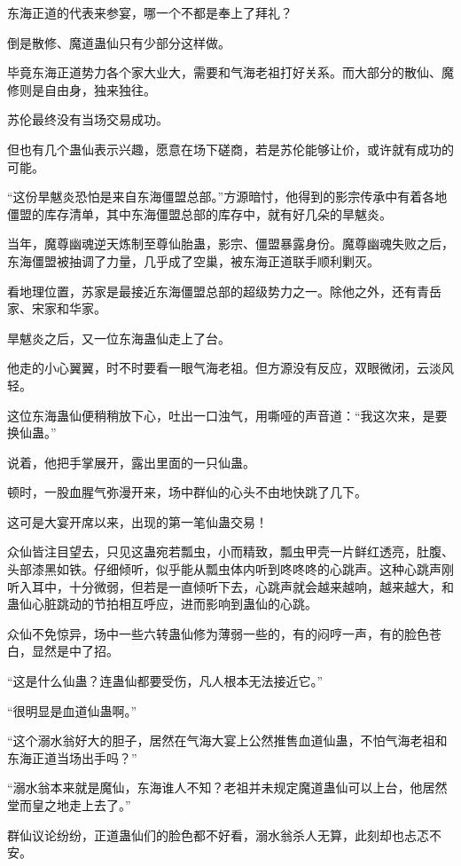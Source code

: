 \begin{this_body}
东海正道的代表来参宴，哪一个不都是奉上了拜礼？

倒是散修、魔道蛊仙只有少部分这样做。

毕竟东海正道势力各个家大业大，需要和气海老祖打好关系。而大部分的散仙、魔修则是自由身，独来独往。

苏伦最终没有当场交易成功。

但也有几个蛊仙表示兴趣，愿意在场下磋商，若是苏伦能够让价，或许就有成功的可能。

“这份旱魃炎恐怕是来自东海僵盟总部。”方源暗忖，他得到的影宗传承中有着各地僵盟的库存清单，其中东海僵盟总部的库存中，就有好几朵的旱魃炎。

当年，魔尊幽魂逆天炼制至尊仙胎蛊，影宗、僵盟暴露身份。魔尊幽魂失败之后，东海僵盟被抽调了力量，几乎成了空巢，被东海正道联手顺利剿灭。

看地理位置，苏家是最接近东海僵盟总部的超级势力之一。除他之外，还有青岳家、宋家和华家。

旱魃炎之后，又一位东海蛊仙走上了台。

他走的小心翼翼，时不时要看一眼气海老祖。但方源没有反应，双眼微闭，云淡风轻。

这位东海蛊仙便稍稍放下心，吐出一口浊气，用嘶哑的声音道：“我这次来，是要换仙蛊。”

说着，他把手掌展开，露出里面的一只仙蛊。

顿时，一股血腥气弥漫开来，场中群仙的心头不由地快跳了几下。

这可是大宴开席以来，出现的第一笔仙蛊交易！

众仙皆注目望去，只见这蛊宛若瓢虫，小而精致，瓢虫甲壳一片鲜红透亮，肚腹、头部漆黑如铁。仔细倾听，似乎能从瓢虫体内听到咚咚咚的心跳声。这种心跳声刚听入耳中，十分微弱，但若是一直倾听下去，心跳声就会越来越响，越来越大，和蛊仙心脏跳动的节拍相互呼应，进而影响到蛊仙的心跳。

众仙不免惊异，场中一些六转蛊仙修为薄弱一些的，有的闷哼一声，有的脸色苍白，显然是中了招。

“这是什么仙蛊？连蛊仙都要受伤，凡人根本无法接近它。”

“很明显是血道仙蛊啊。”

“这个溺水翁好大的胆子，居然在气海大宴上公然推售血道仙蛊，不怕气海老祖和东海正道当场出手吗？”

“溺水翁本来就是魔仙，东海谁人不知？老祖并未规定魔道蛊仙可以上台，他居然堂而皇之地走上去了。”

群仙议论纷纷，正道蛊仙们的脸色都不好看，溺水翁杀人无算，此刻却也忐忑不安。


\end{this_body}
